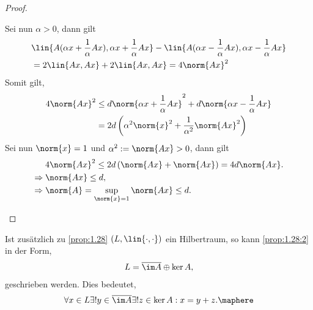 \begin{proof}
\begin{enumerate}[label=(\roman{*})]
Sei nun $\alpha > 0$, dann gilt
\begin{align*}
&\lin{A(\alpha x + \frac{1}{\alpha}Ax),\alpha x + \frac{1}{\alpha}Ax}
- \lin{A(\alpha x - \frac{1}{\alpha}Ax),\alpha x - \frac{1}{\alpha}Ax}
\\ &= 2\lin{Ax,Ax} + 2\lin{Ax,Ax} = 4\norm{Ax}^2
\end{align*}
Somit gilt,
\begin{align*}
4\norm{Ax}^2 &\le d\norm{\alpha x+ \frac{1}{\alpha}Ax}^2 +
d\norm{\alpha x-\frac{1}{\alpha}Ax}\\
&= 2d\left(\alpha^2\norm{x}^2 + \frac{1}{\alpha^2}\norm{Ax}^2\right)
\end{align*}
Sei nun $\norm{x} = 1$ und $\alpha^2 := \norm{Ax} > 0$, dann gilt
\begin{align*}
&4\norm{Ax}^2 \le 2d\left(\norm{Ax} + \norm{Ax}\right) = 4d\norm{Ax}.\\
\Rightarrow\;&\norm{Ax} \le d,\\
\Rightarrow\;&\norm{A} = \sup\limits_{\norm{x}=1}\norm{Ax} \le d.\qedhere
\end{align*}
\end{enumerate}
\end{proof}

\begin{bem}
\label{bem:1.29}
Ist zusätzlich zu \ref{prop:1.28} $(L,\lin{\cdot,\cdot})$ ein Hilbertraum, so
kann \ref{prop:1.28:2} in der Form,
\begin{align*}
L = \overline{\im A}\oplus \ker A,
\end{align*}
geschrieben werden. Dies bedeutet,
\begin{align*}
\forall x\in L \exists! y\in \overline{\im A} \exists! z\in \ker A : x =
y+z.\maphere
\end{align*}
\end{bem}

